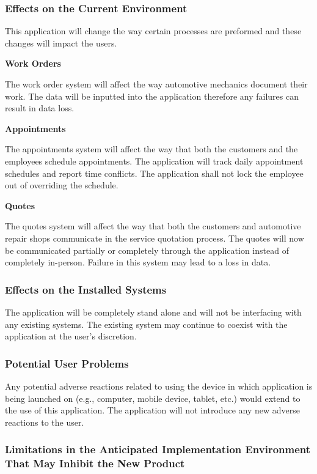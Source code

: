 \documentclass[12pt]{article}
\begin{document}
\subsubsection{Effects on the Current Environment}

This application will change the way certain processes are preformed and these changes will impact
the users.

\textbf{Work Orders}

The work order system will affect the way automotive mechanics document their work. The data will
be inputted into the application therefore any failures can result in data loss.

\textbf{Appointments}

The appointments system will affect the way that both the customers and the employees schedule
appointments. The application will track daily appointment schedules and report time conflicts. The
application shall not lock the employee out of overriding the schedule.

\textbf{Quotes}

The quotes system will affect the way that both the customers and automotive repair shops
communicate in the service quotation process. The quotes will now be communicated partially or
completely through the application instead of completely in-person. Failure in this system may lead
to a loss in data.

\subsubsection{Effects on the Installed Systems}

The application will be completely stand alone and will not be interfacing with any existing
systems. The existing system may continue to coexist with the application at the user's discretion.

\subsubsection{Potential User Problems}

Any potential adverse reactions related to using the device in which application is being launched
on (e.g., computer, mobile device, tablet, etc.) would extend to the use of this application. The
application will not introduce any new adverse reactions to the user.

\subsubsection{Limitations in the Anticipated Implementation Environment That May Inhibit the New Product}
\end{document}

